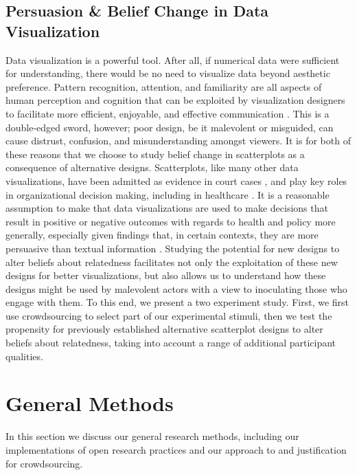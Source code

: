 \documentclass[manuscript,screen,review,anonymous]{acmart}
\begin{document}
\subsection{Persuasion \& Belief Change in Data
Visualization}\label{sec-persuasion}

Data visualization is a powerful tool. After all, if numerical data were
sufficient for understanding, there would be no need to visualize data
beyond aesthetic preference. Pattern recognition, attention, and
familiarity are all aspects of human perception and cognition that can
be exploited by visualization designers to facilitate more efficient,
enjoyable, and effective communication \citep{franconeri_2021}. This is
a double-edged sword, however; poor design, be it malevolent or
misguided, can cause distrust, confusion, and misunderstanding amongst
viewers. It is for both of these reasons that we choose to study belief
change in scatterplots as a consequence of alternative designs.
Scatterplots, like many other data visualizations, have been admitted as
evidence in court cases \citep{bobko_1979}, and play key roles in
organizational decision making, including in healthcare
\citep{poly_2019}. It is a reasonable assumption to make that data
visualizations are used to make decisions that result in positive or
negative outcomes with regards to health and policy more generally,
especially given findings that, in certain contexts, they are more
persuasive than textual information \citep{pandey_2014}. Studying the
potential for new designs to alter beliefs about relatedness facilitates
not only the exploitation of these new designs for better
visualizations, but also allows us to understand how these designs might
be used by malevolent actors with a view to inoculating those who engage
with them. To this end, we present a two experiment study. First, we
first use crowdsourcing to select part of our experimental stimuli, then
we test the propensity for previously established alternative
scatterplot designs to alter beliefs about relatedness, taking into
account a range of additional participant qualities.

\section{General Methods}\label{sec-general-methods}

In this section we discuss our general research methods, including our
implementations of open research practices and our approach to and
justification for crowdsourcing.
\end{document}
